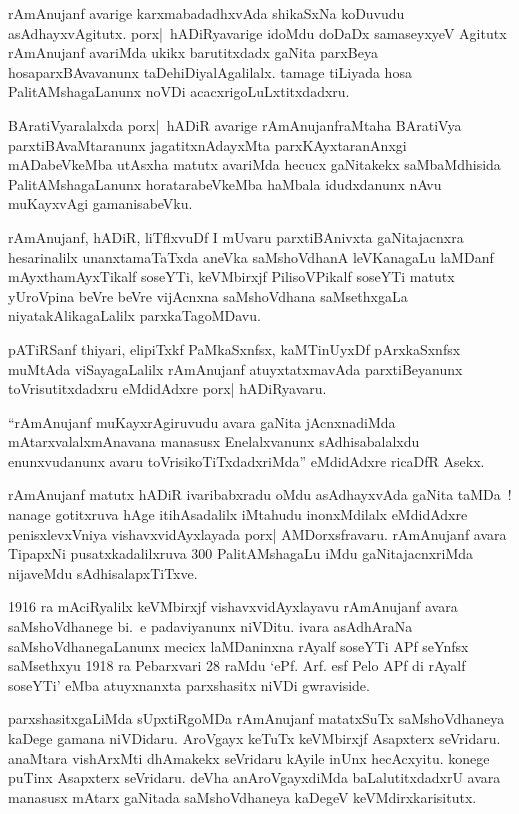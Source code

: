 rAmAnujanf avarige karxmabadadhxvAda shikaSxNa koDuvudu asAdhayxvAgitutx.
porx|~hADiRyavarige idoMdu doDaDx samaseyxyeV Agitutx rAmAnujanf avariMda ukikx barutitxdadx gaNita parxBeya hosaparxBAvavanunx taDehiDiyalAgalilalx. tamage tiLiyada hosa PalitAMshagaLanunx noVDi acacxrigoLuLxtitxdadxru.

BAratiVyaralalxda porx|~hADiR avarige rAmAnujanfraMtaha BAratiVya parxtiBA\-vaMtaranunx jagatitxnAdayxMta parxKAyxtaranAnxgi mADabeVkeMba utAsxha matutx avariMda hecucx gaNitakekx saMbaMdhisida PalitAMshagaLanunx horatarabeVkeMba haMbala idudxdanunx nAvu muKayxvAgi gamanisabeVku.

rAmAnujanf, hADiR, liTflxvuDf I mUvaru parxtiBAnivxta gaNitajacnxra hesarinalilx unanxtamaTaTxda aneVka saMshoVdhanA leVKanagaLu laMDanf mAyxthamAyxTikalf soseYTi, keVMbirxjf PilisoVPikalf soseYTi matutx yUroVpina beVre beVre vijAcnxna saMshoV\-dhana saMsethxgaLa niyatakAlikagaLalilx parxkaTagoMDavu.

pATiRSanf thiyari, elipiTxkf PaMkaSxnfsx, kaMTinUyxDf pArxkaSxnfsx muMtAda viSayagaLalilx rAmAnujanf atuyxtatxmavAda parxtiBeyanunx toVrisutitxdadxru eMdidAdxre porx| hADiRyavaru.

``rAmAnujanf muKayxrAgiruvudu avara gaNita jAcnxnadiMda mAtarxvalalx\break mAnavana manasusx Enelalxvanunx sAdhisabalalxdu enunxvudanunx avaru toVrisikoTiTx\-dadxriMda'' eMdidAdxre ricaDfR Asekx.

rAmAnujanf matutx hADiR ivaribabxradu oMdu asAdhayxvAda gaNita taMDa~! nanage gotitxruva hAge itihAsadalilx iMtahudu inonxMdilalx eMdidAdxre penisxlevxVniya vishavxvidAyxlayada porx| AMDorxsfravaru. rAmAnujanf avara TipapxNi pusatxkadalilxruva {\rm 300} PalitAMshagaLu iMdu gaNitajacnxriMda nijaveMdu sAdhisalapxTiTxve.

{\rm 1916} ra mAciRyalilx keVMbirxjf vishavxvidAyxlayavu rAmAnujanf avara saMshoVdha\-nege bi.~e padaviyanunx niVDitu. ivara asAdhAraNa saMshoVdhanegaLanunx mecicx laMDa\-ninxna rAyalf soseYTi APf seYnfsx saMsethxyu {\rm 1918} ra Pebarxvari {\rm 28} raMdu `ePf. Arf. esf Pelo APf di rAyalf soseYTi' eMba atuyxnanxta parxshasitx niVDi gwraviside.

parxshasitxgaLiMda sUpxtiRgoMDa rAmAnujanf matatxSuTx saMshoVdhaneya kaDege gamana niVDidaru. AroVgayx keTuTx keVMbirxjf Asapxterx seVridaru. anaMtara vishArxMti dhAmakekx seVridaru kAyile inUnx hecAcxyitu. konege puTinx Asapxterx seVridaru. deVha anAroVgayx\-diMda baLalutitxdadxrU avara manasusx mAtarx gaNitada saMshoVdhaneya kaDegeV keVMdirx\-karisitutx.

